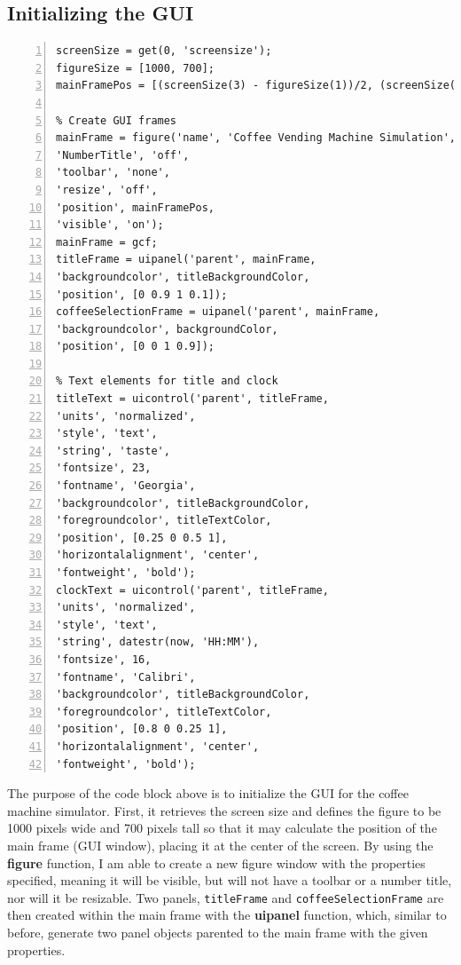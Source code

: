 \documentclass[a4paper, 11pt]{article}
\begin{document}
\subsection{Initializing the GUI}
\begin{lstlisting}[style=Matlab-editor, numbers = left, frame = single]
% Get screen size and calculate figure position
screenSize = get(0, 'screensize');
figureSize = [1000, 700];
mainFramePos = [(screenSize(3) - figureSize(1))/2, (screenSize(4) - figureSize(2))/2, figureSize(1), figureSize(2)];

% Create GUI frames
mainFrame = figure('name', 'Coffee Vending Machine Simulation', 
'NumberTitle', 'off', 
'toolbar', 'none', 
'resize', 'off', 
'position', mainFramePos, 
'visible', 'on');
mainFrame = gcf;
titleFrame = uipanel('parent', mainFrame, 
'backgroundcolor', titleBackgroundColor, 
'position', [0 0.9 1 0.1]);
coffeeSelectionFrame = uipanel('parent', mainFrame, 
'backgroundcolor', backgroundColor, 
'position', [0 0 1 0.9]);

% Text elements for title and clock
titleText = uicontrol('parent', titleFrame, 
'units', 'normalized', 
'style', 'text', 
'string', 'taste', 
'fontsize', 23, 
'fontname', 'Georgia', 
'backgroundcolor', titleBackgroundColor, 
'foregroundcolor', titleTextColor, 
'position', [0.25 0 0.5 1], 
'horizontalalignment', 'center', 
'fontweight', 'bold');
clockText = uicontrol('parent', titleFrame, 
'units', 'normalized', 
'style', 'text', 
'string', datestr(now, 'HH:MM'), 
'fontsize', 16, 
'fontname', 'Calibri', 
'backgroundcolor', titleBackgroundColor, 
'foregroundcolor', titleTextColor, 
'position', [0.8 0 0.25 1], 
'horizontalalignment', 'center', 
'fontweight', 'bold');
\end{lstlisting}
\vspace{5mm}
\noindent The purpose of the code block above is to initialize the GUI for the coffee machine simulator. First, it retrieves the screen size and defines the figure to be 1000 pixels wide and 700 pixels tall so that it may calculate the position of the main frame (GUI window), placing it at the center of the screen.
\vspace{5mm}
\newpage
\noindent By using the \textbf{figure} function, I am able to create a new figure window with the properties specified, meaning it will be visible, but will not have a toolbar or a number title, nor will it be resizable. Two panels, \texttt{titleFrame} and \texttt{coffeeSelectionFrame} are then created within the main frame with the \textbf{uipanel} function, which, similar to before, generate two panel objects parented to the main frame with the given properties. 
\end{document}
